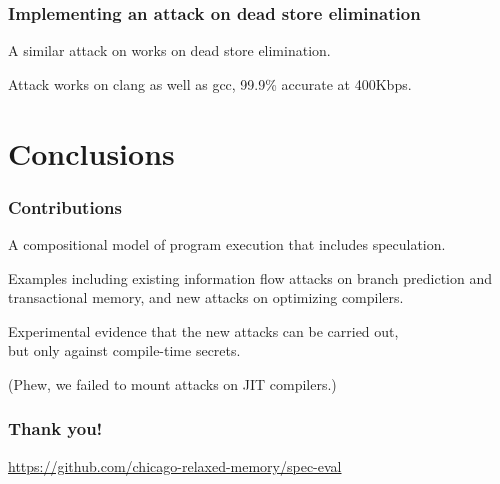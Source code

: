 \documentclass[aspectratio=169]{beamer}
\begin{document}
\begin{frame}
  \frametitle{Implementing an attack on dead store elimination}

  A similar attack on works on dead store elimination.

  \bigskip
  Attack works on clang as well as gcc,
  99.9\% accurate at 400Kbps.
\end{frame}

\section{Conclusions}
\begin{frame}
  \frametitle{Contributions}

  A compositional model of program execution that includes speculation.

  \bigskip
  Examples
  including existing information flow attacks on
  branch prediction and transactional memory, and new attacks on optimizing compilers.

  \bigskip
  Experimental evidence that the new attacks can be carried out,\\
  but only against compile-time secrets.

  \bigskip
  (Phew, we failed to mount attacks on JIT compilers.)
\end{frame}





\begin{frame}
  \frametitle{Thank you!}
  \url{https://github.com/chicago-relaxed-memory/spec-eval}
\end{frame}
\end{document}

